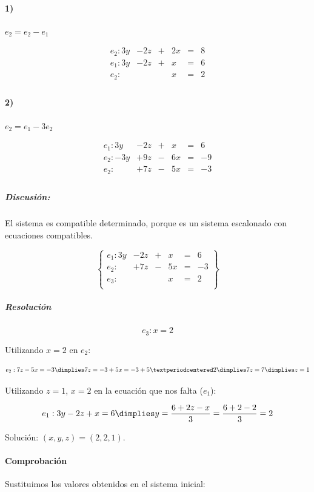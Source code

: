 \documentclass[palatino,nosec,nochap]{Docencia}
\begin{document}
\begin{problem}
\paragraph{1)}
$e_2 = e_2-e_1$

\[
\begin{array}{rccccc}
e_2: 3y&-2z&+&2x&=&8\\
e_1: 3y&-2z&+&x&=&6\\
\hline
e_2: &&&x&=&2\\
\end{array}
\]	


\paragraph{2)} $e_2 = e_1-3e_2$

\[
\begin{array}{rccccc}
e_1: 3y&-2z&+&x&=&6\\
e_2: -3y&+9z&-&6x&=&-9\\
\hline
e_2: &+7z&-&5x&=&-3\\
\end{array}
\]	



\subparagraph{Discusión:} El sistema es compatible determinado, porque es un sistema escalonado con ecuaciones compatibles.

\[
\left\{\begin{array}{lccccc}
e_1: 3y&-2z&+&x&=&6\\
e_2: &+7z&-&5x&=&-3\\
e_3: &&&x&=&2\\
\end{array}\right\}
\]


\subparagraph{Resolución} 

\[e_3: x=2\]

Utilizando $x=2$ en $e_2$:

\[e_2: 7z-5x = -3 \dimplies 7z = -3+5x = -3+5·2 \dimplies 7z=7 \dimplies z=1\]

Utilizando $z=1$, $x=2$ en la ecuación que nos falta ($e_1$):

\[
e_1: 3y-2z+x=6 \dimplies y=\frac{6+2z-x}{3} = \frac{6+2-2}{3} = 2
\]


Solución: $(x,y,z) = (2,2,1)$.

\paragraph{Comprobación}

Sustituimos los valores obtenidos en el sistema inicial:



\end{problem}
\end{document}
